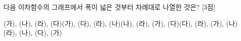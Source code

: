 다음 이차함수의 그래프에서 폭이 넓은 것부터 차례대로 나열한 것은? \mbox{[3점]}
\begin{choicesii}{(가), (나), (라), (다)}{(가), (다), (라), (나)}{(나), (라), (가), (다)}{(다), (라), (가), (나)}{(라), (나), (다), (가)}\end{choicesii}
